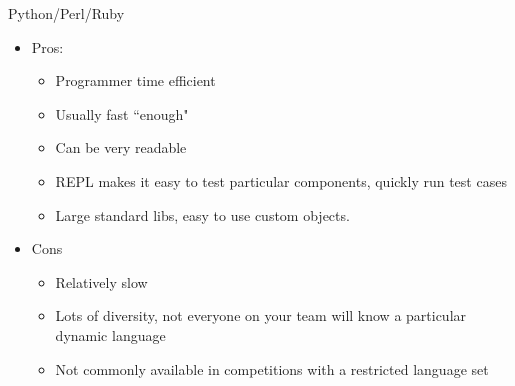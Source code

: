\documentclass{beamer}
\begin{document}
\begin{frame}{Python/Perl/Ruby}
  \begin{centering}
    \begin{itemize}
      \item Pros:
      \begin{itemize}
        \item Programmer time efficient
        \item Usually fast ``enough"
        \item Can be very readable
        \item REPL makes it easy to test particular components, quickly run test cases
        \item Large standard libs, easy to use custom objects.
      \end{itemize}
      \item Cons
      \begin{itemize}
        \item Relatively slow
        \item Lots of diversity, not everyone on your team will know a particular dynamic language
        \item Not commonly available in competitions with a restricted language set
      \end{itemize}
    \end{itemize}
  \end{centering}
\end{frame}
\end{document}
